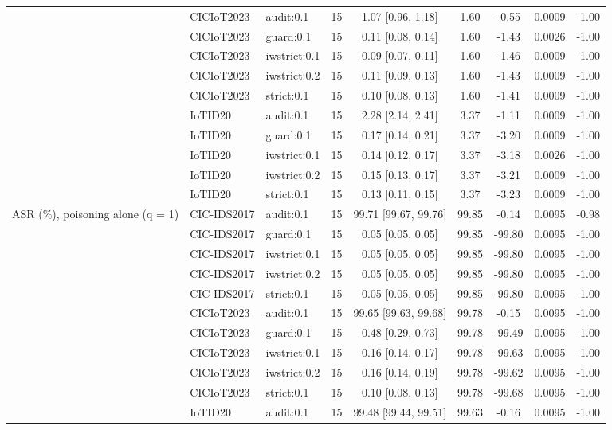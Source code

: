 \begin{table}[t]
\begin{tabular}{lllcccccc}
 & CICIoT2023 & audit:0.1 & 15 & 1.07 [0.96, 1.18] & 1.60 & -0.55 & 0.0009 & -1.00 \\
 & CICIoT2023 & guard:0.1 & 15 & 0.11 [0.08, 0.14] & 1.60 & -1.43 & 0.0026 & -1.00 \\
 & CICIoT2023 & iwstrict:0.1 & 15 & 0.09 [0.07, 0.11] & 1.60 & -1.46 & 0.0009 & -1.00 \\
 & CICIoT2023 & iwstrict:0.2 & 15 & 0.11 [0.09, 0.13] & 1.60 & -1.43 & 0.0009 & -1.00 \\
 & CICIoT2023 & strict:0.1 & 15 & 0.10 [0.08, 0.13] & 1.60 & -1.41 & 0.0009 & -1.00 \\
 & IoTID20 & audit:0.1 & 15 & 2.28 [2.14, 2.41] & 3.37 & -1.11 & 0.0009 & -1.00 \\
 & IoTID20 & guard:0.1 & 15 & 0.17 [0.14, 0.21] & 3.37 & -3.20 & 0.0009 & -1.00 \\
 & IoTID20 & iwstrict:0.1 & 15 & 0.14 [0.12, 0.17] & 3.37 & -3.18 & 0.0026 & -1.00 \\
 & IoTID20 & iwstrict:0.2 & 15 & 0.15 [0.13, 0.17] & 3.37 & -3.21 & 0.0009 & -1.00 \\
 & IoTID20 & strict:0.1 & 15 & 0.13 [0.11, 0.15] & 3.37 & -3.23 & 0.0009 & -1.00 \\
ASR (\%), poisoning alone (q = 1) & CIC-IDS2017 & audit:0.1 & 15 & 99.71 [99.67, 99.76] & 99.85 & -0.14 & 0.0095 & -0.98 \\
 & CIC-IDS2017 & guard:0.1 & 15 & 0.05 [0.05, 0.05] & 99.85 & -99.80 & 0.0095 & -1.00 \\
 & CIC-IDS2017 & iwstrict:0.1 & 15 & 0.05 [0.05, 0.05] & 99.85 & -99.80 & 0.0095 & -1.00 \\
 & CIC-IDS2017 & iwstrict:0.2 & 15 & 0.05 [0.05, 0.05] & 99.85 & -99.80 & 0.0095 & -1.00 \\
 & CIC-IDS2017 & strict:0.1 & 15 & 0.05 [0.05, 0.05] & 99.85 & -99.80 & 0.0095 & -1.00 \\
 & CICIoT2023 & audit:0.1 & 15 & 99.65 [99.63, 99.68] & 99.78 & -0.15 & 0.0095 & -1.00 \\
 & CICIoT2023 & guard:0.1 & 15 & 0.48 [0.29, 0.73] & 99.78 & -99.49 & 0.0095 & -1.00 \\
 & CICIoT2023 & iwstrict:0.1 & 15 & 0.16 [0.14, 0.17] & 99.78 & -99.63 & 0.0095 & -1.00 \\
 & CICIoT2023 & iwstrict:0.2 & 15 & 0.16 [0.14, 0.19] & 99.78 & -99.62 & 0.0095 & -1.00 \\
 & CICIoT2023 & strict:0.1 & 15 & 0.10 [0.08, 0.13] & 99.78 & -99.68 & 0.0095 & -1.00 \\
 & IoTID20 & audit:0.1 & 15 & 99.48 [99.44, 99.51] & 99.63 & -0.16 & 0.0095 & -1.00 \\

\end{tabular}
\end{table}
